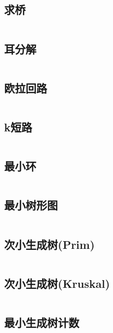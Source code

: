\inputminted{cpp}{code/BCCedge.cc}

\subsection{求桥} 

\inputminted{cpp}{code/bridge.cc}

\subsection{	耳分解} 

\inputminted{cpp}{code/耳分解.cc}

\subsection{欧拉回路} 

\inputminted{cpp}{code/euler_circuit.cc}

\subsection{k短路} 

\inputminted{cpp}{code/kth_shortest_path.cc}

\subsection{最小环} 

\inputminted{cpp}{code/floyd_mincycle.cc}

\subsection{最小树形图} 

\inputminted{cpp}{code/Directed_MST.cc}

\subsection{次小生成树(Prim)} 

\inputminted{cpp}{code/SMST_Prim.cc}

\subsection{次小生成树(Kruskal)} 

\inputminted{cpp}{code/SMST_Kruskal.cc}

\subsection{最小生成树计数} 

